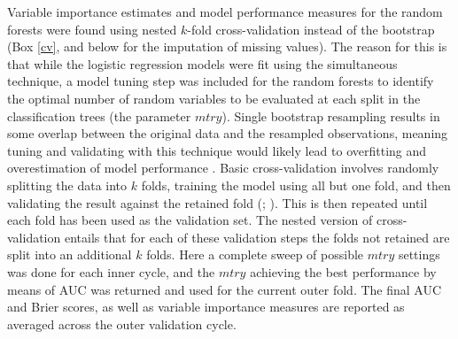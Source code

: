 \documentclass[12pt, a4paper]{article}
\begin{document}
Variable importance estimates and model performance measures for the random forests were found using nested $k$-fold cross-validation instead of the bootstrap (Box \ref{cv}, and below for the imputation of missing values). The reason for this is that while the logistic regression models were fit using the simultaneous technique, a model tuning step was included for the random forests to identify the optimal number of random variables to be evaluated at each split in the classification trees (the parameter $mtry$). Single bootstrap resampling results in some overlap between the original data and the resampled observations, meaning tuning and validating with this technique would likely lead to overfitting and overestimation of model performance \citep[][250]{hastie2009}. Basic cross-validation involves randomly splitting the data into $k$ folds, training the model using all but one fold, and then validating the result against the retained fold (\citealp[92]{verhagen2009}; \citealp[][241--249]{hastie2009}). This is then repeated until each fold has been used as the validation set. The nested version of cross-validation entails that for each of these validation steps the folds not retained are split into an additional $k$ folds. Here a complete sweep of possible $mtry$ settings was done for each inner cycle, and the $mtry$ achieving the best performance by means of AUC was returned and used for the current outer fold. The final AUC and Brier scores, as well as variable importance measures are reported as averaged across the outer validation cycle.\\
\end{document}
